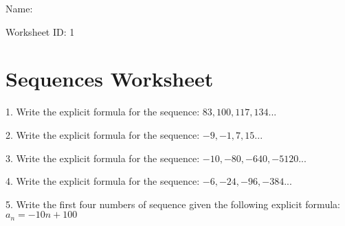 \documentclass[12pt]{article}
\begin{document}
\begin{flushright}
Name: \underline{\hspace{2.5 in}}
\end{flushright}
\begin{flushright}
Worksheet ID: 1
\end{flushright}
\section*{Sequences Worksheet}




1. Write the explicit formula for the sequence:  $83, 
100, 117, 134  . . .$ \underline{\hspace{2 in}}

\vspace{.2in}



2. Write the explicit formula for the sequence:  $-9, 
-1, 7, 15  . . .$ \underline{\hspace{2 in}}

\vspace{.2in}





3. Write the explicit formula for the sequence:  $-10, 
-80, -640, -5120 . . .$ \underline{\hspace{2 in}}

\vspace{.2in}



4. Write the explicit formula for the sequence:  $-6, 
-24, -96, -384 . . .$ \underline{\hspace{2 in}}

\vspace{.2in}





5. Write the first four numbers of sequence given the following
explicit formula:   $a_n = -10n + 100$ 

\vspace{.2in}
\end{document}

